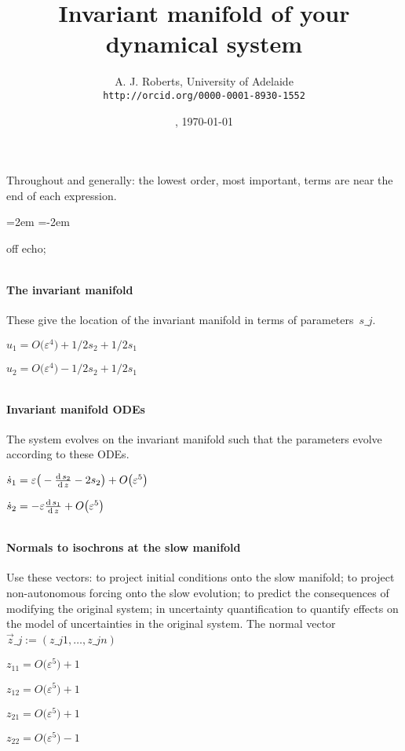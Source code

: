 \documentclass[11pt,a5paper]{article}
\title{Invariant manifold of your dynamical system}
\author{A. J. Roberts, University of Adelaide\\
\texttt{http://orcid.org/0000-0001-8930-1552}}
\date{\now, \today}
\begin{document}
\maketitle
Throughout and generally: the lowest order, most
important, terms are near the end of each expression.
\par\leftskip=2em  \parindent=-2em


off echo;

\(
\)
\paragraph{The invariant manifold}
These give the location of the invariant manifold in
terms of parameters~\(s\_ j\).
\(
\)\par
\(u_{1}=O\big(\varepsilon ^{4}\big)+1/2 s_{2}+1/2 s_{1}
\)\par
\(u_{2}=O\big(\varepsilon ^{4}\big)-1/2 s_{2}+1/2 s_{1}
\)\par
\(
\)
\paragraph{Invariant manifold ODEs}
The system evolves on the invariant manifold such
that the parameters evolve according to these ODEs.
\(
\)\par
\(\dot s_{1}=\varepsilon \big(-\frac{{\rm d}\,s_{2}}{{\rm d}\,z}-2 s_{2}\big)+O
\big(\varepsilon ^{5}\big)
\)\par
\(\dot s_{2}=-\varepsilon \frac{{\rm d}\,s_{1}}{{\rm d}\,z}+O\big(\varepsilon ^{5
}\big)
\)\par
\(
\)
\paragraph{Normals to isochrons at the slow manifold}
Use these vectors: to project initial conditions
onto the slow manifold; to project non-autonomous
forcing onto the slow evolution; to predict the
consequences of modifying the original system; in
uncertainty quantification to quantify effects on
the model of uncertainties in the original system.
The normal vector \(\vec z\_j:=(z\_{j1},\ldots,z\_{jn})\)
\(
\)\par
\(z_{11}=O\big(\varepsilon ^{5}\big)+1
\)\par
\(z_{12}=O\big(\varepsilon ^{5}\big)+1
\)\par
\(z_{21}=O\big(\varepsilon ^{5}\big)+1
\)\par
\(z_{22}=O\big(\varepsilon ^{5}\big)-1
\)\par
\(
\)\par
\end{document}
